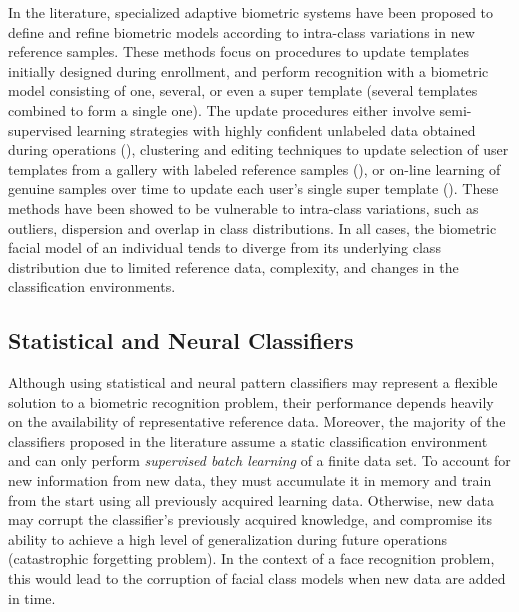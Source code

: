 In the literature, specialized adaptive biometric systems have been proposed to define and refine biometric models according to intra-class variations in new reference samples.
These methods focus on procedures to update templates initially designed during enrollment, and perform recognition with a biometric model consisting of one, several, or even a super template (several templates combined to form a single one).
The update procedures either involve semi-supervised learning strategies with highly confident unlabeled data obtained during operations (\cite{poh09, rattani10}), clustering and editing techniques to update selection of user templates from a gallery with labeled reference samples (\cite{uludag04}), or on-line learning of genuine samples over time to update each user's single super template (\cite{jiang02}).
These methods have been showed to be vulnerable to intra-class variations, such as outliers, dispersion and overlap in class distributions.
In all cases, the biometric facial model of an individual tends to diverge from its underlying class distribution due to limited reference data, complexity, and changes in the classification environments.

\subsection{Statistical and Neural Classifiers}

Although using statistical and neural pattern classifiers may represent a flexible solution to a biometric recognition problem, their performance depends heavily on the availability of representative reference data.
Moreover, the majority of the classifiers proposed in the literature assume a static classification environment and can only perform \emph{supervised batch learning} of a finite data set.
To account for new information from new data, they must accumulate it in memory and train from the start using all previously acquired learning data.
Otherwise, new data may corrupt the classifier's previously acquired knowledge, and compromise its ability to achieve a high level of generalization during future operations (catastrophic forgetting problem).
In the context of a face recognition problem, this would lead to the corruption of facial class models when new data are added in time.

